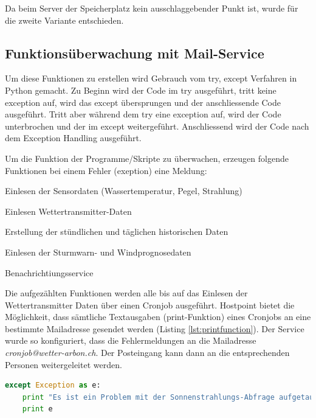 Da beim Server der Speicherplatz kein ausschlaggebender Punkt ist, wurde für die zweite Variante entschieden.



\subsection{Funktionsüberwachung mit Mail-Service}\label{kap:Funktionsüberwachung}
Um diese Funktionen zu erstellen wird Gebrauch vom try, except Verfahren in Python gemacht. Zu Beginn wird der Code im try ausgeführt, tritt keine exception auf, wird das except übersprungen und der anschliessende Code ausgeführt. Tritt aber während dem try eine exception auf, wird der Code unterbrochen und der im except weitergeführt. Anschliessend wird der Code nach dem Exception Handling ausgeführt.\cite{ThePythonTutorial8.ErrorsAndExceptions:Python}

Um die Funktion der Programme/Skripte zu überwachen, erzeugen folgende Funktionen bei einem Fehler (exeption) eine Meldung:

\begin{itemize*}
\item Einlesen der Sensordaten (Wassertemperatur, Pegel, Strahlung)
\item Einlesen Wettertransmitter-Daten
\item Erstellung der stündlichen und täglichen historischen Daten
\item Einlesen der Sturmwarn- und Windprognosedaten
\item Benachrichtiungsservice
\end{itemize*}

Die aufgezählten Funktionen werden alle bis auf das Einlesen der Wettertransmitter Daten über einen Cronjob ausgeführt. Hostpoint bietet die Möglichkeit, dass sämtliche Textausgaben (print-Funktion) eines Cronjobs an eine bestimmte Mailadresse gesendet werden (Listing \ref{lst:printfunction}). Der Service wurde so konfiguriert, dass die Fehlermeldungen an die Mailadresse \emph{cronjob@wetter-arbon.ch}. Der Posteingang kann dann an die entsprechenden Personen weitergeleitet werden.

\begin{lstlisting}[label=lst:printfunction,caption=Beispiel für print Funktion, language=Python, style=py]
except Exception as e:
    print "Es ist ein Problem mit der Sonnenstrahlungs-Abfrage aufgetaucht: "
    print e
\end{lstlisting}

